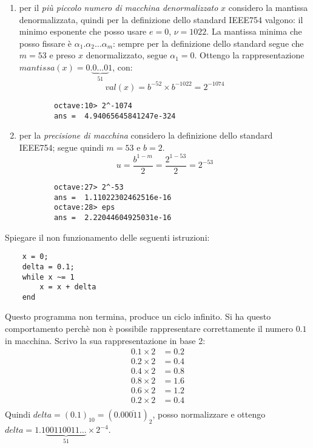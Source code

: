 \begin{enumerate}
	\item per il \emph{pi\`u piccolo numero di macchina denormalizzato} $x$ considero la 
	mantissa denormalizzata,
	quindi per la definizione dello standard IEEE754 valgono: il minimo esponente che posso
	usare $e = 0$, $\nu = 1022$.
	La mantissa minima che posso fissare \`e $\alpha_{1}.\alpha_{2} \ldots \alpha_{m}$:
	sempre per la definizione dello standard segue che $m = 53$ e preso $x$ denormalizzato,
	segue $\alpha_{1} = 0$. Ottengo la rappresentazione 
		$mantissa(x) = 0.\underbrace{0 \ldots 0}_{51} 1$, con:
	\begin{displaymath}
		val(x) = b^{-52} \times b^{-1022} = 2^{-1074}
	\end{displaymath}
	\begin{lstlisting}
		octave:10> 2^-1074
		ans =  4.94065645841247e-324
	\end{lstlisting}
	
	\item per la \emph{precisione di macchina} considero la definizione dello 
		standard IEEE754; segue quindi  $m = 53$ e $b = 2$.
	\begin{displaymath}
		u = \frac{b^{1-m}}{2} = \frac{2^{1-53}}{2} = 2^{-53}
	\end{displaymath}
	\begin{lstlisting}
		octave:27> 2^-53
		ans =  1.11022302462516e-16
		octave:28> eps
		ans =  2.22044604925031e-16
	\end{lstlisting}

\end{enumerate}

\begin{exercise}[1.11]
 Spiegare il non funzionamento delle seguenti istruzioni:
\end{exercise}
\begin{lstlisting}
	x = 0; 
	delta = 0.1;
	while x ~= 1
		x = x + delta 
	end
\end{lstlisting}
Questo programma non termina, produce un ciclo infinito. Si ha questo comportamento
perch\`e non \`e possibile rappresentare correttamente il numero $0.1$ in macchina. 
Scrivo la sua rappresentazione in base 2:
\begin{displaymath}
\begin{split}
	0.1 \times 2 &= 0.2 \\
	0.2 \times 2 &= 0.4 \\
	0.4 \times 2 &= 0.8 \\
	0.8 \times 2 &= 1.6 \\
	0.6 \times 2 &= 1.2 \\
	0.2 \times 2 &= 0.4 \\
\end{split}
\end{displaymath}
Quindi $delta = (0.1)_{10} = (0.0\overline{0011})_{2}$, posso normalizzare e ottengo
$delta = 1.1\underbrace{0011 0011\ldots}_{51} \times 2^{-4}$. 


